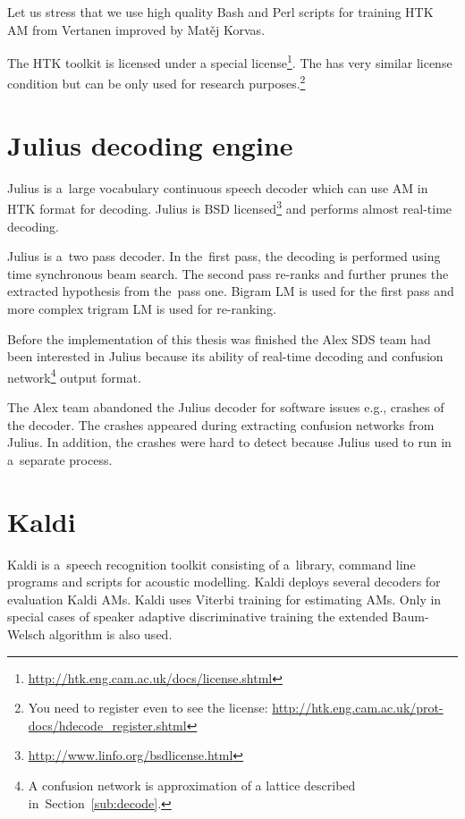 Let us stress that we use high quality Bash and Perl scripts for training \ac{HTK} \ac{AM} from Vertanen improved by Matěj Korvas.\cite{vertanen_baseline_2006}\cite{korvas_2014}

The \ac{HTK} toolkit is licensed under a special license\footnote{\url{http://htk.eng.cam.ac.uk/docs/license.shtml}}.
The  has very similar license condition but can be only used for research purposes.\footnote{You need to register even to see the license: \url{http://htk.eng.cam.ac.uk/prot-docs/hdecode_register.shtml}}

\section{Julius decoding engine}
\label{sec:back_julius}

Julius is a~large vocabulary continuous speech decoder which can use \ac{AM} in \ac{HTK} format for decoding.\cite{lee2009julius}
Julius is BSD licensed\footnote{\url{http://www.linfo.org/bsdlicense.html}} and performs almost real-time decoding.

Julius is a~two pass decoder. 
In the~first pass, the decoding is performed using time synchronous beam search.
The second pass re-ranks and further prunes the extracted hypothesis from the~pass one.
Bigram \ac{LM} is used for the first pass and more complex trigram \ac{LM} is used for re-ranking.

Before the implementation of this thesis was finished the Alex \ac{SDS} team had been interested in Julius because its ability of real-time decoding and confusion network\footnote{A confusion network is approximation of a lattice described in~Section~\ref{sub:decode}.} output format.

The Alex team abandoned the Julius decoder for software issues e.g., crashes of the decoder. 
The crashes appeared during extracting confusion networks from Julius. 
In addition, the crashes were hard to detect because Julius used to run in a~separate process.

\section{Kaldi}
\label{sec:back_kaldi}

Kaldi is a~speech recognition toolkit consisting of a~library, command line programs and scripts for acoustic modelling.
Kaldi deploys several decoders for evaluation Kaldi \acp{AM}.
Kaldi uses Viterbi training for estimating \acp{AM}. 
Only in special cases of speaker adaptive discriminative training the extended Baum-Welsch algorithm is also used\cite{povey2011kaldi}.

